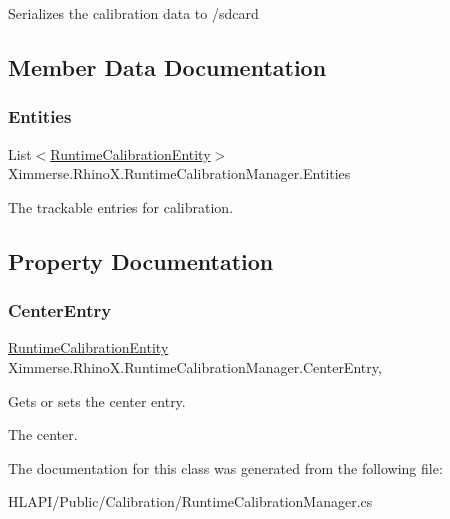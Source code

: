 Serializes the calibration data to /sdcard 



\subsection{Member Data Documentation}
\mbox{\label{class_ximmerse_1_1_rhino_x_1_1_runtime_calibration_manager_abf1b09b36bf1e6bccca57a451a263376}} 
\subsubsection{\texorpdfstring{Entities}{Entities}}
{\footnotesize\ttfamily List$<$\mbox{\hyperlink{class_ximmerse_1_1_rhino_x_1_1_runtime_calibration_entity}{Runtime\+Calibration\+Entity}}$>$ Ximmerse.\+Rhino\+X.\+Runtime\+Calibration\+Manager.\+Entities}



The trackable entries for calibration. 



\subsection{Property Documentation}
\mbox{\label{class_ximmerse_1_1_rhino_x_1_1_runtime_calibration_manager_a1202f2b01cb1c6e6ee7f332ee0ad9e97}} 
\subsubsection{\texorpdfstring{Center\+Entry}{CenterEntry}}
{\footnotesize\ttfamily \mbox{\hyperlink{class_ximmerse_1_1_rhino_x_1_1_runtime_calibration_entity}{Runtime\+Calibration\+Entity}} Ximmerse.\+Rhino\+X.\+Runtime\+Calibration\+Manager.\+Center\+Entry\hspace{0.3cm}{\ttfamily [get]}, {\ttfamily [set]}}



Gets or sets the center entry. 

The center.

The documentation for this class was generated from the following file\+:\begin{DoxyCompactItemize}
\item 
H\+L\+A\+P\+I/\+Public/\+Calibration/Runtime\+Calibration\+Manager.\+cs\end{DoxyCompactItemize}
